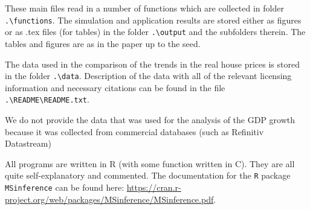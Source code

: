 \documentclass[a4paper,12pt]{article}
\begin{document}
These main files read in a number of functions which are collected in folder \linebreak \verb|.\functions|. The simulation and application results are stored either as figures or as .tex files (for tables) in the folder \verb|.\output| and the subfolders therein. The tables and figures are as in the paper up to the seed.


The data used in the comparison of the trends in the real house prices is stored in the folder \verb|.\data|. Description of the data with all of the relevant licensing information and necessary citations can be found in the file \verb|.\README\README.txt|.

We do not provide the data that was used for the analysis of the GDP growth because it was collected from commercial databases (such as Refinitiv Datastream)



All programs are written in R (with some function written in C). They are all quite self-explanatory and commented. The documentation for the \verb|R| package \verb|MSinference| can be found here: \url{https://cran.r-project.org/web/packages/MSinference/MSinference.pdf}.

\newpage

{\small
\setlength{\bibsep}{0.55em}
}
\end{document}
